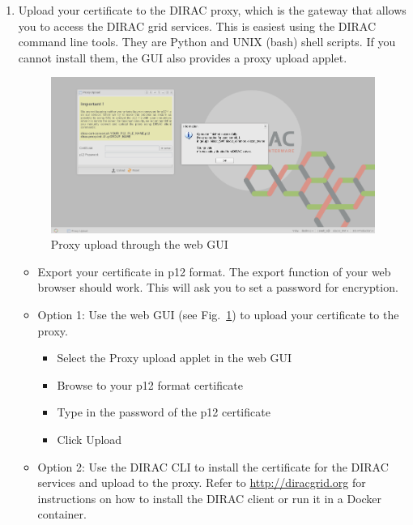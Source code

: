 \documentclass[a4paper]{article}
\begin{document}
\begin{enumerate}
  
\item Upload your certificate to the DIRAC proxy, which is the gateway
  that allows you to access the DIRAC grid services. This is easiest
  using the DIRAC command line tools. They are Python and UNIX (bash)
  shell scripts. If you cannot install them, the GUI also provides a proxy upload applet.

  \begin{figure}[htb]
    \centering
    \includegraphics[width=1.0\linewidth]{dirac-gui-proxy}
    \caption{Proxy upload through the web GUI}
    \label{fig:proxygui}
  \end{figure}
  
  \begin{itemize}
  
  \item Export your certificate in p12 format. The export
    function of your web browser should work. This will ask you to
    set a password for encryption.

    
  \item Option 1: Use the web GUI (see Fig.~\ref{fig:proxygui}) to upload your certificate to the proxy.
    \begin{itemize}
    \item Select the Proxy upload applet in the web GUI
    \item Browse to your p12 format certificate
    \item Type in the password of the p12 certificate
    \item Click Upload
    \end{itemize}

  \item Option 2: Use the DIRAC CLI to install the certificate for the DIRAC services and upload to the proxy.  Refer to \url{http://diracgrid.org} for instructions on how to install the DIRAC client or run it in a Docker container.


\end{itemize}
\end{enumerate}
\end{document}
